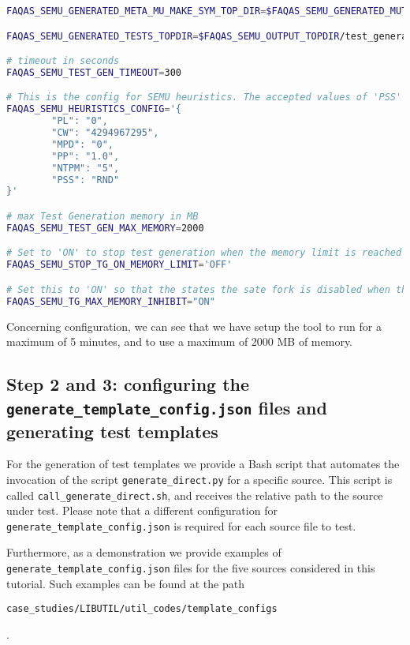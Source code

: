 \begin{lstlisting}[language=bash,label=listing:LIBUTIL:conf,caption=faqas\_semus\_conf.sh file for LIBUTIL case study.]
FAQAS_SEMU_GENERATED_META_MU_MAKE_SYM_TOP_DIR=$FAQAS_SEMU_GENERATED_MUTANTS_TOPDIR/"MakeSym-TestGen-Input"

FAQAS_SEMU_GENERATED_TESTS_TOPDIR=$FAQAS_SEMU_OUTPUT_TOPDIR/test_generation

# timeout in seconds
FAQAS_SEMU_TEST_GEN_TIMEOUT=300

# This is the config for SEMU heuristics. The accepted values of 'PSS' are 'RND' for random and 'MDO' for minimum distance to output
FAQAS_SEMU_HEURISTICS_CONFIG='{
        "PL": "0",
        "CW": "4294967295",
        "MPD": "0",
        "PP": "1.0",
        "NTPM": "5",
        "PSS": "RND"
}'

# max Test Generation memory in MB
FAQAS_SEMU_TEST_GEN_MAX_MEMORY=2000

# Set to 'ON' to stop test generation when the memory limit is reached
FAQAS_SEMU_STOP_TG_ON_MEMORY_LIMIT='OFF'

# Set this to 'ON' so that the states the sate fork is disabled when the memory limit is reached, to avoid going much over it
FAQAS_SEMU_TG_MAX_MEMORY_INHIBIT="ON"
\end{lstlisting}

Concerning \SEMU configuration, we can see that we have setup the tool to run for a maximum of 5 minutes, and to use a maximum of 2000 MB of memory.

\subsection{Step 2 and 3: configuring the \texttt{generate\_template\_config.json} files and generating test templates}

For the generation of test templates we provide a Bash script that automates the invocation of the script \texttt{generate\_direct.py} for a specific source. This script is called \texttt{call\_generate\_direct.sh}, and receives the relative path to the source under test.
Please note that a different configuration for \texttt{generate\_template\_config.json} is required for each source file to test.


Furthermore, as a demonstration we provide examples of \texttt{generate\_template\_config.json} files for the five sources considered in this tutorial. Such examples can be found at the path \begin{small}\texttt{case\_studies/LIBUTIL/util\_codes/template\_configs}\end{small}.

